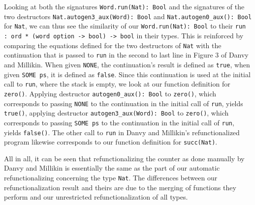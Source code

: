 Looking at both the signatures \texttt{Word.run(Nat): Bool} and the signatures of the two destructors \texttt{Nat.autogen3\_aux(Word): Bool} and \texttt{Nat.autogen0\_aux(): Bool} for \texttt{Nat}, we can thus see the similarity of our \texttt{Word.run(Nat): Bool} to their \texttt{run : ord * (word option -> bool) -> bool} in their types. This is reinforced by comparing the equations defined for the two destructors of \texttt{Nat} with the continuation that is passed to \texttt{run} in the second to last line in Figure 3 of Danvy and Millikin. When given \texttt{NONE}, the continuation's result is defined as \texttt{true}, when given \texttt{SOME ps}, it is defined as \texttt{false}. Since this continuation is used at the initial call to \texttt{run}, where the stack is empty, we look at our function definition for \texttt{zero()}. Applying destructor \texttt{autogen0\_aux(): Bool} to \texttt{zero()}, which corresponds to passing \texttt{NONE} to the continuation in the initial call of \texttt{run}, yields \texttt{true()}, applying destructor \texttt{autogen3\_aux(Word): Bool} to \texttt{zero()}, which corresponds to passing \texttt{SOME ps} to the continuation in the initial call of \texttt{run}, yields \texttt{false()}. The other call to \texttt{run} in Danvy and Millikin's refunctionalized program likewise corresponds to our function definition for \texttt{succ(Nat)}.

All in all, it can be seen that refunctionalizing the counter as done manually by Danvy and Millikin is essentially the same as the part of our automatic refunctionalizing concerning the type \texttt{Nat}. The differences between our refunctionalization result and theirs are due to the merging of functions they perform and our unrestricted refunctionalization of all types.
